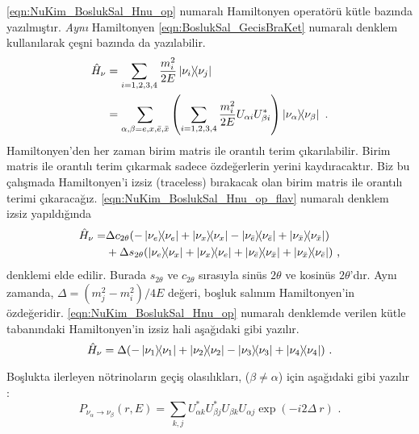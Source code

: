 \eqref{eqn:NuKim_BoslukSal_Hnu_op} numaralı Hamiltonyen operatörü kütle bazında yazılmıştır. \emph{Aynı} Hamiltonyen \eqref{eqn:BoslukSal_GecisBraKet} numaralı denklem kullanılarak çeşni bazında da yazılabilir.
\begin{align} \label{eqn:NuKim_BoslukSal_Hnu_op_flav}
	\nonumber \hat{H}_{\nu} & = \sum_{i=1,2,3,4} \frac{m_{i}^{2}}{2E} \dyad{\nu_{i}}{\nu_{j}}\\
	              & = \sum_{\alpha,\beta = e,x,\bar{e},\bar{x}} \qty(\sum_{i=1,2,3,4} \frac{m_{i}^{2}}{2E} U_{\alpha i} U^{*}_{\beta i})\dyad{\nu_{\alpha}}{\nu_{\beta}} \text{ .}
\end{align}
Hamiltonyen'den her zaman birim matris ile orantılı terim çıkarılabilir. Birim matris ile orantılı terim çıkarmak sadece özdeğerlerin yerini kaydıracaktır. Biz bu çalışmada Hamiltonyen'i izsiz (traceless) bırakacak olan birim matris ile orantılı terimi çıkaracağız. \eqref{eqn:NuKim_BoslukSal_Hnu_op_flav} numaralı denklem izsiz yapıldığında
\begin{align}\label{eqn:NuKim_BoslukSal_Hnu_op_flavTraceless}
    \nonumber \hat{H}_{\nu} =& \Delta c_{2\theta} \qty(-\dyad{\nu_{e}}{\nu_{e}}+\dyad{\nu_{x}}{\nu_{x}}-\dyad{\nu_{\bar{e}}}{\nu_{\bar{e}}}+\dyad{\nu_{\bar{x}}}{\nu_{\bar{x}}})\\
    &+ \Delta s_{2\theta} \qty(\dyad{\nu_{e}}{\nu_{x}}+\dyad{\nu_{x}}{\nu_{e}}+\dyad{\nu_{\bar{e}}}{\nu_{\bar{x}}}+\dyad{\nu_{\bar{x}}}{\nu_{\bar{e}}}) \text{ ,}
\end{align}
denklemi elde edilir. Burada $ s_{2\theta} $ ve $ c_{2\theta} $ sırasıyla sinüs $ 2\theta $ ve kosinüs $ 2\theta $'dır. Aynı zamanda, $\Delta= (m^{2}_{j}-m^{2}_{i})/4E $ değeri, boşluk salınım Hamiltonyen'in özdeğeridir. \eqref{eqn:NuKim_BoslukSal_Hnu_op} numaralı denklemde verilen kütle tabanındaki Hamiltonyen'in izsiz hali aşağıdaki gibi yazılır.
\begin{equation}\label{eqn:NuKim_BoslukSal_Hnu_op_massTraceless}
   \hat{H}_{\nu} = \Delta\qty(-\dyad{\nu_{1}}{\nu_{1}}+\dyad{\nu_{2}}{\nu_{2}}-\dyad{\nu_{3}}{\nu_{3}}+\dyad{\nu_{4}}{\nu_{4}} ) \text{ .}
\end{equation}

Boşlukta ilerleyen nötrinoların geçiş olasılıkları, ($ \beta \ne \alpha $) için aşağıdaki gibi yazılır \cite{Giunti:2007ry}:
\begin{equation}\label{eqn:TransitionProbability}
    P_{\nu_{\alpha}\rightarrow\nu_{\beta}}(r,E)=\sum_{k,j}U^{*}_{\alpha k}U^{*}_{\beta j}U_{\beta k}U_{\alpha j} \exp(-i 2 \Delta~r) \text{ .} 
\end{equation}

